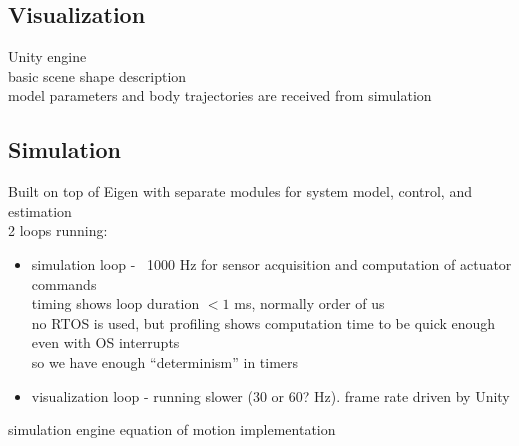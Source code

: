 \documentclass[11pt,a4paper,reqno]{amsart}
\begin{document}
\subsection{Visualization}
Unity engine \\
basic scene shape description \\
model parameters and body trajectories are received from simulation \\
\subsection{Simulation}
Built on top of Eigen with separate modules for system model, control, and estimation \\
2 loops running:
\begin{itemize}
    \item simulation loop - ~1000 Hz for sensor acquisition and computation of actuator commands\\
        timing shows loop duration  $ < 1 $ ms, normally order of us\\
        no RTOS is used, but profiling shows computation time to be quick enough even with OS interrupts\\
        so we have enough ``determinism'' in timers
    \item visualization loop - running slower (30 or 60? Hz). frame rate driven by Unity
\end{itemize}
simulation engine equation of motion implementation
\end{document}
